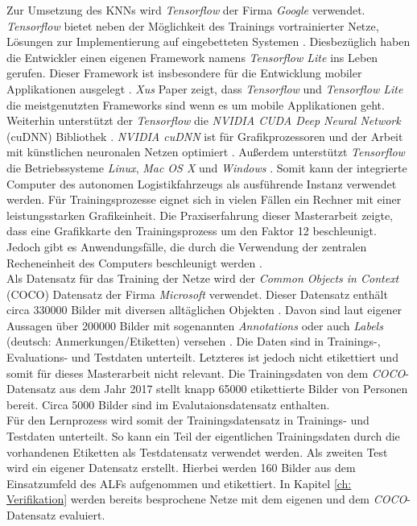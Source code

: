 		Zur Umsetzung des KNNs wird \textit{Tensorflow} der Firma \textit{Google} verwendet. \textit{Tensorflow} bietet neben der Möglichkeit des Trainings vortrainierter Netze, Lösungen zur Implementierung auf eingebetteten Systemen \cite{frameworks}. Diesbezüglich haben die Entwickler einen eigenen Framework namens \textit{Tensorflow Lite} ins Leben gerufen. Dieser Framework ist insbesondere für die Entwicklung mobiler Applikationen ausgelegt \cite{tflite}. \textit{Xus} Paper zeigt, dass \textit{Tensorflow} und \textit{Tensorflow Lite} die meistgenutzten Frameworks sind wenn es um mobile Applikationen geht. Weiterhin unterstützt der \textit{Tensorflow} die \textit{NVIDIA CUDA Deep Neural Network} (cuDNN) Bibliothek \cite{frameworks}. \textit{NVIDIA cuDNN} ist für Grafikprozessoren und der Arbeit mit künstlichen neuronalen Netzen optimiert \cite{frameworks}. Außerdem unterstützt \textit{Tensorflow} die Betriebssysteme \textit{Linux}, \textit{Mac OS X} und \textit{Windows} \cite{frameworks}. Somit kann der integrierte Computer des autonomen Logistikfahrzeugs als ausführende Instanz verwendet werden. Für Trainingsprozesse eignet sich in vielen Fällen ein Rechner mit einer leistungsstarken Grafikeinheit. Die Praxiserfahrung dieser Masterarbeit zeigte, dass eine Grafikkarte den Trainingsprozess um den Faktor 12 beschleunigt. Jedoch gibt es Anwendungsfälle, die durch die Verwendung der zentralen Recheneinheit des Computers beschleunigt werden \cite{cpugpu}. \\
		
		Als Datensatz für das Training der Netze wird der \textit{Common Objects in Context} (COCO) Datensatz der Firma \textit{Microsoft} verwendet. Dieser Datensatz enthält circa 330000 Bilder mit diversen alltäglichen Objekten \cite{coco, cocopaper}. Davon sind laut eigener Aussagen über 200000 Bilder mit sogenannten \textit{Annotations} oder auch \textit{Labels} (deutsch: Anmerkungen/Etiketten) versehen \cite{coco}. Die Daten sind in Trainings-, Evaluations- und Testdaten unterteilt. Letzteres ist jedoch nicht etikettiert und somit für dieses Masterarbeit nicht relevant. Die Trainingsdaten von dem \textit{COCO}-Datensatz aus dem Jahr 2017 stellt knapp 65000 etikettierte Bilder von Personen bereit. Circa 5000 Bilder sind im Evalutaionsdatensatz enthalten.\\
		
		Für den Lernprozess wird somit der Trainingsdatensatz in Trainings- und Testdaten unterteilt. So kann ein Teil der eigentlichen Trainingsdaten durch die vorhandenen Etiketten als Testdatensatz verwendet werden. Als zweiten Test wird ein eigener Datensatz erstellt. Hierbei werden 160 Bilder aus dem Einsatzumfeld des ALFs aufgenommen und etikettiert. In Kapitel \ref{ch: Verifikation} werden bereits besprochene Netze mit dem eigenen und dem \textit{COCO}-Datensatz evaluiert.
		
